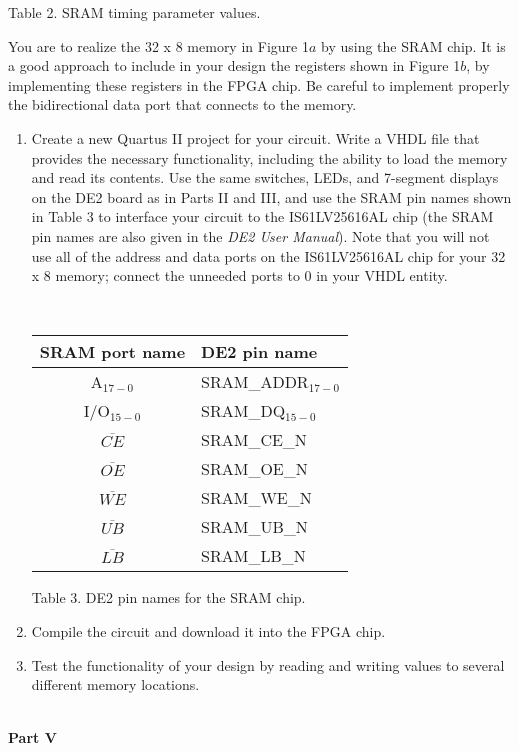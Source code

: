 \documentclass[psfig,10pt,fullpage]{article}
\begin{document}
\begin{center}
Table 2. SRAM timing parameter values.
\end{center}

\noindent
You are to realize the 32 {\sf x} 8 memory in Figure 1$a$ by using the SRAM chip. 
It is a good approach to include in your design the registers shown in Figure 1$b$, by
implementing these registers in the FPGA chip.
Be careful to implement properly the bidirectional data port that connects to the memory.

\begin{enumerate}
\item Create a new Quartus II project for your circuit. Write a VHDL file that provides
the necessary functionality, including the ability to load the memory and read its 
contents. Use the same switches, LEDs, and 7-segment displays on the DE2 board 
as in Parts II and III, and use the SRAM pin names shown in Table 3 to interface your 
circuit to the IS61LV25616AL chip (the SRAM pin names are also given in the 
{\it DE2 User Manual}). Note that you will not use all of the address and data ports on the
IS61LV25616AL chip for your 32 {\sf x} 8 memory; connect the unneeded ports to 0 in
your VHDL entity.

~\\
\begin{center}
\begin{tabular}{c|l}
SRAM port name & DE2 pin name \\ \hline
\rule[-0.075in]{0in}{0.25in} A$_{17-0}$ & SRAM\_ADDR$_{17-0}$\\ 
I/O$_{15-0}$ & SRAM\_DQ$_{15-0}$\\ 
$\overline{CE}$ & SRAM\_CE\_N\\ 
$\overline{OE}$ & SRAM\_OE\_N\\ 
$\overline{WE}$ & SRAM\_WE\_N\\ 
$\overline{UB}$ & SRAM\_UB\_N\\ 
$\overline{LB}$ & SRAM\_LB\_N\\ 
\end{tabular}
\end{center}

\begin{center}
Table 3. DE2 pin names for the SRAM chip.
\end{center}

\item Compile the circuit and download it into the FPGA chip.
\item Test the functionality of your design by reading and writing values to several
different memory locations.
\end{enumerate}
~\\
\noindent
{\bf Part V}
\end{document}
